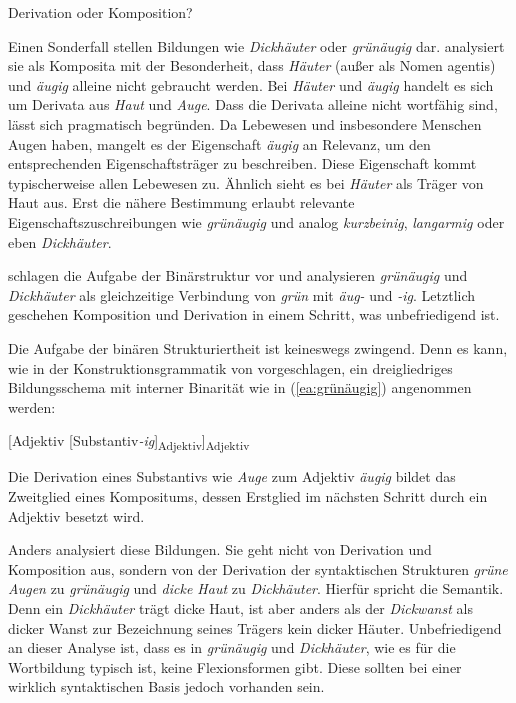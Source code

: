 \begin{Exkurs}{Derivation oder Komposition?}\label{subsubsection:DerivationoderKomposition} 

Einen Sonderfall stellen Bildungen wie \textit{Dickhäuter} oder \textit{grünäugig} dar. \citet{Leser1990} analysiert sie als Komposita mit der Besonderheit, dass \textit{Häuter} (außer als Nomen agentis) und \textit{äugig} alleine nicht gebraucht werden. Bei \textit{Häuter} und \textit{äugig} handelt es sich um Derivata aus \textit{Haut} und \textit{Auge}. Dass die Derivata alleine nicht wortfähig sind, lässt sich pragmatisch begründen. Da Lebewesen und insbesondere Menschen Augen haben, mangelt es der Eigenschaft \textit{äugig} an Relevanz, um den entsprechenden Eigenschaftsträger zu beschreiben. Diese Eigenschaft kommt typischerweise allen Lebewesen zu. Ähnlich sieht es bei \textit{Häuter} als Träger von Haut aus. Erst die nähere Bestimmung erlaubt relevante Eigenschaftszuschreibungen wie \textit{grünäugig} und analog \textit{kurzbeinig}, \textit{langarmig} oder eben \textit{Dickhäuter}. 

\citet[61--62]{Meibauer_et_al_2015} schlagen die Aufgabe der Binärstruktur vor und analysieren \textit{grünäugig} und \textit{Dickhäuter} als gleichzeitige Verbindung von \textit{grün} mit \textit{äug-} und \textit{-ig}. Letztlich geschehen Komposition und Derivation in einem Schritt, was unbefriedigend ist. 

Die Aufgabe der binären Strukturiertheit ist keineswegs zwingend. Denn es kann, wie in der Konstruktionsgrammatik von \citet[128]{Booij2005} vorgeschlagen, ein dreigliedriges Bildungsschema mit interner Binarität wie in (\ref{ea:grünäugig}) angenommen werden: 

\ea \label{ea:grünäugig}[Adjektiv [Substantiv\textit{-ig}]\textsubscript{Adjektiv}]\textsubscript{Adjektiv}
\z 

Die Derivation eines Substantivs wie \textit{Auge} zum Adjektiv \textit{äugig} bildet das Zweitglied eines Kompositums, dessen Erstglied im nächsten Schritt durch ein Adjektiv besetzt wird. 

Anders analysiert \citet[93]{Donalies2005WbÜb} diese Bildungen. Sie geht nicht von Derivation und Komposition aus, sondern von der Derivation der syntaktischen Strukturen \textit{grüne Augen} zu \textit{grünäugig} und \textit{dicke Haut} zu \textit{Dickhäuter}. Hierfür spricht die Semantik. Denn ein \textit{Dickhäuter} trägt dicke Haut, ist aber anders als der \textit{Dickwanst} als dicker Wanst zur Bezeichnung seines Trägers kein dicker Häuter. Unbefriedigend an dieser Analyse ist, dass es in \textit{grünäugig} und \textit{Dickhäuter}, wie es für die Wortbildung typisch ist, keine Flexionsformen gibt. Diese sollten bei einer wirklich syntaktischen Basis jedoch vorhanden sein.


\end{Exkurs}
